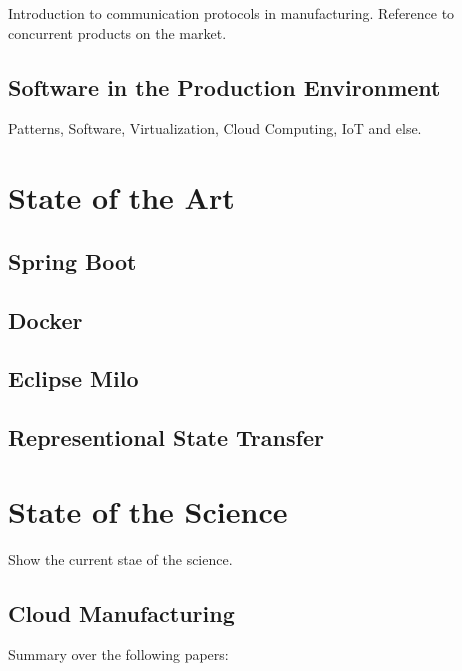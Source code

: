 \documentclass[
a4paper,
twoside,
headsepline,
cleardoublepage=empty,
parskip=half,
draft=false
]{scrbook}
\begin{document}
			Introduction to communication protocols in manufacturing. Reference to concurrent products on the market.
			
		\section{Software in the Production Environment}\label{sec:software_in_the_production_environment}
		
			Patterns, Software, Virtualization, Cloud Computing, IoT and else.
		
	\chapter{State of the Art}\label{ch:state_of_the_art}
			
		\section{Spring Boot}\label{subsec:spring_boot}
		
		\section{Docker}\label{sec:docker}
		
		\section{Eclipse Milo}\label{sec:eclipse_milo}
		
		\section{Representional State Transfer}\label{sec:rest}
						
	\chapter{State of the Science} \label{ch:state_of_the_Science}
	
		Show the current stae of the science.
		
		\section{Cloud Manufacturing}\label{sec:industry_4}
		
			Summary over the following papers:
			
\end{document}
